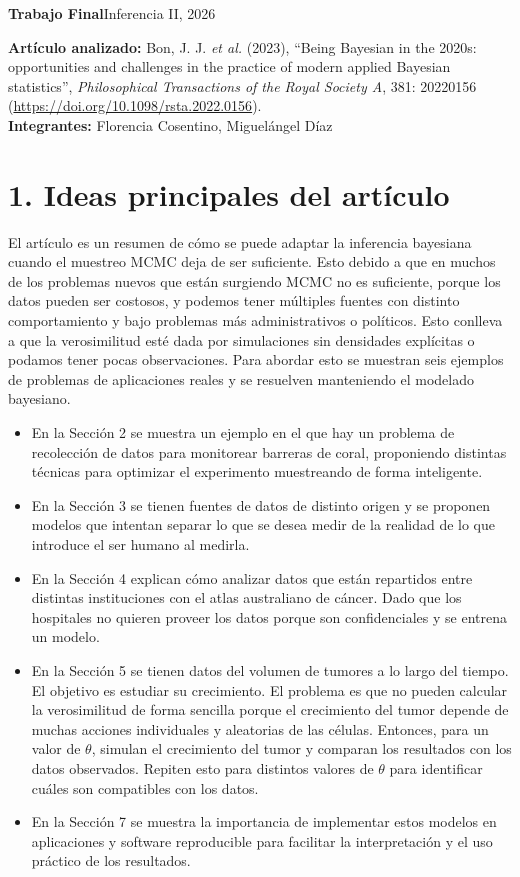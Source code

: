 \documentclass[10pt,a4paper]{article}
\begin{document}
{\Large\bfseries Trabajo Final}\hfill Inferencia II, 2026
\par\smallskip
\textbf{Artículo analizado:} Bon, J. J. \emph{et al.} (2023), ``Being Bayesian in the 2020s: opportunities and challenges in the practice of modern applied Bayesian statistics'', \emph{Philosophical Transactions of the Royal Society A}, 381: 20220156 (\url{https://doi.org/10.1098/rsta.2022.0156}).\\
\textbf{Integrantes:} Florencia Cosentino, Miguelángel Díaz
\par\medskip

\section{1. Ideas principales del artículo}\label{sec:ideas}

El artículo es un resumen de cómo se puede adaptar la inferencia bayesiana cuando el muestreo MCMC deja de ser suficiente. Esto debido a que en muchos de los problemas nuevos que están surgiendo MCMC no es suficiente, porque los datos pueden ser costosos, y podemos tener múltiples fuentes con distinto comportamiento y bajo problemas más administrativos o políticos. Esto conlleva a que la verosimilitud esté dada por simulaciones sin densidades explícitas o podamos tener pocas observaciones. Para abordar esto se muestran seis ejemplos de problemas de aplicaciones reales y se resuelven manteniendo el modelado bayesiano.

\begin{itemize}
\item En la Sección 2 se muestra un ejemplo en el que hay un problema de recolección de datos para monitorear barreras de coral, proponiendo distintas técnicas para optimizar el experimento muestreando de forma inteligente.
\item En la Sección 3 se tienen fuentes de datos de distinto origen y se proponen modelos que intentan separar lo que se desea medir de la realidad de lo que introduce el ser humano al medirla.
\item En la Sección 4 explican cómo analizar datos que están repartidos entre distintas instituciones con el atlas australiano de cáncer. Dado que los hospitales no quieren proveer los datos porque son confidenciales y se entrena un modelo.
\item En la Sección 5 se tienen datos del volumen de tumores a lo largo del tiempo. El objetivo es estudiar su crecimiento. El problema es que no pueden calcular la verosimilitud de forma sencilla porque el crecimiento del tumor depende de muchas acciones individuales y aleatorias de las células. Entonces, para un valor de $\theta$, simulan el crecimiento del tumor y comparan los resultados con los datos observados. Repiten esto para distintos valores de $\theta$ para identificar cuáles son compatibles con los datos.
\item En la Sección 7 se muestra la importancia de implementar estos modelos en aplicaciones y software reproducible para facilitar la interpretación y el uso práctico de los resultados.
\end{itemize}
\end{document}
